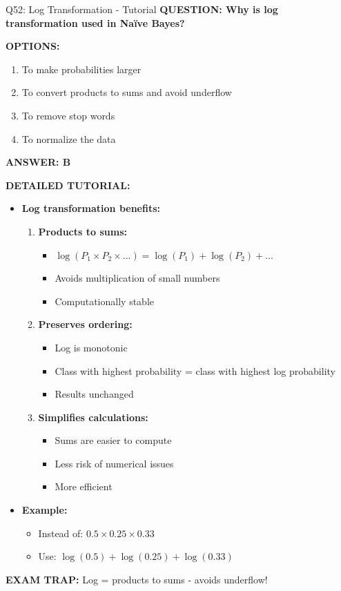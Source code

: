 \documentclass[8pt]{beamer}
\begin{document}
	\begin{frame}{Q52: Log Transformation - Tutorial}
		\fontsize{6.5}{7.5}\selectfont
		\textbf{QUESTION: Why is log transformation used in Naïve Bayes?}
		
		\vspace{0.1cm}
		\textbf{OPTIONS:}
		\begin{enumerate}
			\item To make probabilities larger
			\item To convert products to sums and avoid underflow
			\item To remove stop words
			\item To normalize the data
		\end{enumerate}
		
		\vspace{0.1cm}
		\textcolor{myblue}{\textbf{ANSWER: B}}
		
		\vspace{0.1cm}
		\textbf{DETAILED TUTORIAL:}
		\begin{itemize}
			\item \textbf{Log transformation benefits:}
			\begin{enumerate}
				\item \textbf{Products to sums:}
				\begin{itemize}
					\item $\log(P_1 \times P_2 \times ...) = \log(P_1) + \log(P_2) + ...$
					\item Avoids multiplication of small numbers
					\item Computationally stable
				\end{itemize}
				\item \textbf{Preserves ordering:}
				\begin{itemize}
					\item Log is monotonic
					\item Class with highest probability = class with highest log probability
					\item Results unchanged
				\end{itemize}
				\item \textbf{Simplifies calculations:}
				\begin{itemize}
					\item Sums are easier to compute
					\item Less risk of numerical issues
					\item More efficient
				\end{itemize}
			\end{enumerate}
			\item \textbf{Example:}
			\begin{itemize}
				\item Instead of: $0.5 \times 0.25 \times 0.33$
				\item Use: $\log(0.5) + \log(0.25) + \log(0.33)$
			\end{itemize}
		\end{itemize}
		
		\textcolor{myred}{\textbf{EXAM TRAP:}} Log = \textcolor{myblue}{products to sums} - avoids underflow!
	\end{frame}
	
\end{document}
